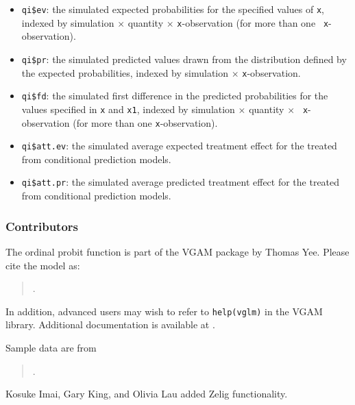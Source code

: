 \begin{itemize}
   \begin{itemize}
   \item {\tt qi\$ev}: the simulated expected probabilities for the
     specified values of {\tt x}, indexed by simulation $\times$
     quantity $\times$ {\tt x}-observation (for more than one {\tt
       x}-observation).
   \item {\tt qi\$pr}: the simulated predicted values drawn from the
     distribution defined by the expected probabilities, indexed by
     simulation $\times$ {\tt x}-observation.
   \item {\tt qi\$fd}: the simulated first difference in the predicted
     probabilities for the values specified in {\tt x} and {\tt x1},
     indexed by simulation $\times$ quantity $\times$ {\tt
       x}-observation (for more than one {\tt x}-observation).
   \item {\tt qi\$att.ev}: the simulated average expected treatment
     effect for the treated from conditional prediction models.  
   \item {\tt qi\$att.pr}: the simulated average predicted treatment
     effect for the treated from conditional prediction models.  
   \end{itemize}
\end{itemize}

\subsubsection{Contributors}

The ordinal probit function is part of the VGAM package by Thomas Yee.
Please cite the model as:
\begin{verse}
.
\end{verse}

In addition, advanced users may wish to refer to \texttt{help(vglm)} 
in the VGAM library.  Additional
documentation is available at
.

Sample data are from 
\begin{verse}
.  
\end{verse}

Kosuke Imai, Gary King, and Olivia Lau added Zelig functionality.  









